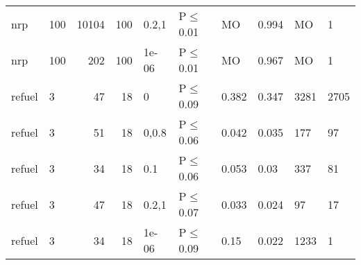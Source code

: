 \begin{longtable}{llrrllllll}
 nrp           & 100      &  	10104 & 100 & 0.2,1 & P$\leq$0.01  & MO      & 0.994    & MO     & 1      \\
 nrp           & 100      &    	202 & 100 & 1e-06 & P$\leq$0.01  & MO      & 0.967    & MO     & 1      \\
 refuel        & 3        &     	47 &  18 & 0     & P$\leq$0.09  & 0.382   & 0.347    & 3281   & 2705   \\
 refuel        & 3        &     	51 &  18 & 0,0.8 & P$\leq$0.06  & 0.042   & 0.035    & 177    & 97     \\
 refuel        & 3        &     	34 &  18 & 0.1   & P$\leq$0.06  & 0.053   & 0.03     & 337    & 81     \\
 refuel        & 3        &     	47 &  18 & 0.2,1 & P$\leq$0.07  & 0.033   & 0.024    & 97     & 17     \\
 refuel        & 3        &     	34 &  18 & 1e-06 & P$\leq$0.09  & 0.15    & 0.022    & 1233   & 1      \\
\bottomrule
\end{longtable}
